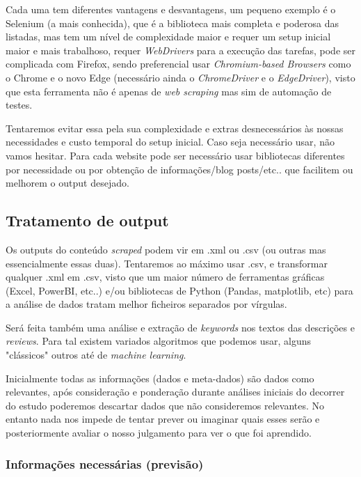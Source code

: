 \documentclass[a4paper,10pt]{article}
\begin{document}
Cada uma tem diferentes vantagens e desvantagens, um pequeno exemplo é o Selenium (a mais conhecida), que é a biblioteca mais completa e poderosa das listadas, mas tem um nível de complexidade maior e requer um setup inicial maior e mais trabalhoso, requer \textit{WebDrivers} para a execução das tarefas, pode ser complicada com Firefox, sendo preferencial usar \textit{Chromium-based Browsers} como o Chrome e o novo Edge (necessário ainda o \textit{ChromeDriver} e o \textit{EdgeDriver}), visto que esta ferramenta não é apenas de \textit{web scraping} mas sim de automação de testes.

Tentaremos evitar essa pela sua complexidade e extras desnecessários às nossas necessidades e custo temporal do setup inicial. 
Caso seja necessário usar, não vamos hesitar. 
Para cada website pode ser necessário usar bibliotecas diferentes por necessidade ou por obtenção de informações/blog posts/etc.. que facilitem ou melhorem o output desejado.

\subsection{Tratamento de output}

Os outputs do conteúdo \textit{scraped} podem vir em .xml ou .csv (ou outras mas essencialmente essas duas). 
Tentaremos ao máximo usar .csv, e transformar qualquer .xml em .csv, visto que um maior número de ferramentas gráficas (Excel, PowerBI, etc..) e/ou bibliotecas de Python (Pandas, matplotlib, etc) para a análise de dados tratam melhor ficheiros separados por vírgulas.

Será feita também uma análise e extração de \textit{keywords} nos textos das descrições e \textit{reviews}.
Para tal existem variados algoritmos que podemos usar, alguns "clássicos" outros até de \textit{machine learning}.

Inicialmente todas as informações (dados e meta-dados) são dados como relevantes, após consideração e ponderação durante análises iniciais do decorrer do estudo poderemos descartar dados que não consideremos relevantes. 
No entanto nada nos impede de tentar prever ou imaginar quais esses serão e posteriormente avaliar o nosso julgamento para ver o que foi aprendido.

\subsubsection{Informações necessárias (previsão)}
\end{document}
